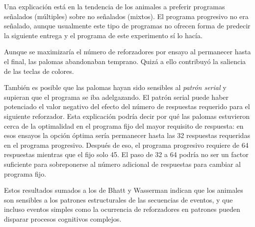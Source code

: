 \documentclass[a4paper,12pt]{article}
\begin{document}
Una explicación está en la tendencia de los animales a preferir programas señalados (múltiples) sobre no señalados (mixtos). El programa progresivo no era señalado, aunque usualmente este tipo de programas no ofrecen forma de predecir la siguiente entrega y el programa de este experimento sí lo hacía.

Aunque se maximizaría el número de reforzadores por ensayo al permanecer hasta el final, las palomas abandonaban temprano. Quizá a ello contribuyó la saliencia de las teclas de colores.

También es posible que las palomas hayan sido sensibles al {\itshape patrón serial} y supieran que el programa se iba adelgazando. El patrón serial puede haber potenciado el valor negativo del efecto del número de respuestas requerido para el siguiente reforzador. Esta explicación podría decir por qué las palomas estuvieron cerca de la optimalidad en el programa fijo del mayor requisito de respuesta: en esos ensayos la opción óptima sería permanecer hasta las 32 respuestas requeridas en el programa progresivo. Después de eso, el programa progresivo requiere de 64 respuestas mientras que el fijo solo 45. El paso de 32 a 64 podría no ser un factor suficiente para sobreponerse al número adicional de respuestas para cambiar al programa fijo.

Estos resultados sumados a los de Bhatt y Wasserman indican que los animales son sensibles a los patrones estructurales de las secuencias de eventos, y que incluso eventos simples como la ocurrencia de reforzadores en patrones pueden disparar procesos cognitivos complejos.
\end{document}
